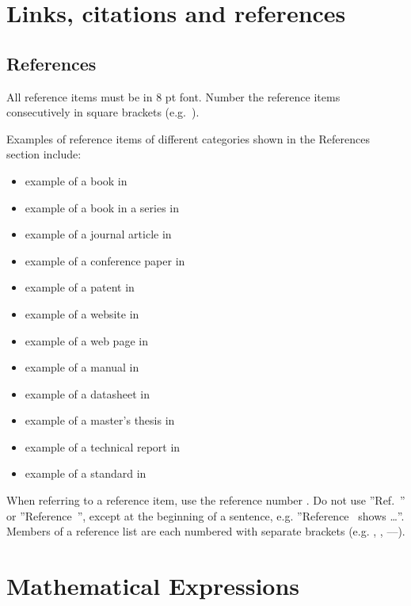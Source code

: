\documentclass[10pt,conference,a4paper,onecolumn] {IEEEtran}
\begin{document}
\begin{multicols}{2}
\newpage
\section{Links, citations and references}



\subsection{References}
 All reference items must be in 8 pt font. Number the reference items consecutively in square brackets (e.g.~\cite{Metev:1998}).

Examples of reference items of different categories shown in the References section include:
\begin{itemize}
  \item example of a book in \cite{Metev:1998}
  \item example of a book in a series in \cite{Breckling:1989}
  \item example of a journal article in \cite{Zhang:1999}
  \item example of a conference paper in \cite{Wegmuller:2000}
  \item example of a patent in \cite{Sorace:1997}
  \item example of a website in \cite{IEEE:website}
  \item example of a web page in \cite{CTAN:webpage}
  \item example of a manual in \cite{Motorola:1996}
  \item example of a datasheet in \cite{PDCA12-70}
  \item example of a master’s thesis in \cite{Karnik:1999}
  \item example of a technical report in \cite{Padyhe:1999}
  \item example of a standard in \cite{IEEE:802.11}
\end{itemize}

When referring to a reference item, use the reference number \cite{Breckling:1989}.  Do not use ''Ref.~\cite{Zhang:1999}'' or ''Reference~\cite{Zhang:1999}'', except at the beginning of a sentence, e.g.  ''Reference~\cite{Zhang:1999} shows \ldots''.  Members of a reference list are each numbered with separate brackets (e.g. \cite{Breckling:1989}, \cite{Zhang:1999}, \cite{Wegmuller:2000}–--\cite{IEEE:website}).

\section{Mathematical Expressions}


\end{multicols}
\end{document}
